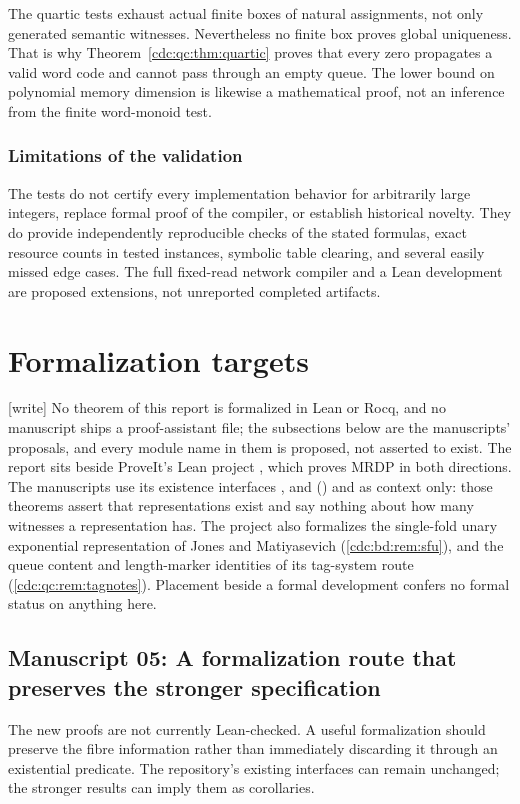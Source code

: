 \documentclass[11pt,a4paper]{article}
\theoremstyle{definition}
\theoremstyle{remark}
\newcommand{\code}[1]{\texttt{\detokenize{#1}}}
\newcommand{\wtag}{\textup{[write]}}%
\begin{document}
The quartic tests exhaust actual finite boxes of natural assignments, not only generated semantic witnesses. Nevertheless no finite box proves global uniqueness. That is why Theorem~\ref{cdc:qc:thm:quartic} proves that every zero propagates a valid word code and cannot pass through an empty queue. The lower bound on polynomial memory dimension is likewise a mathematical proof, not an inference from the finite word-monoid test.

\subsubsection{Limitations of the validation}
The tests do not certify every implementation behavior for arbitrarily large integers, replace formal proof of the compiler, or establish historical novelty. They do provide independently reproducible checks of the stated formulas, exact resource counts in tested instances, symbolic table clearing, and several easily missed edge cases. The full fixed-read network compiler and a Lean development are proposed extensions, not unreported completed artifacts.


\section{Formalization targets}\label{cdc:sec:formal}
\wtag{} No theorem of this report is formalized in Lean or Rocq, and no manuscript ships a proof-assistant file; the subsections below are the manuscripts' proposals, and every module name in them is proposed, not asserted to exist. The report sits beside ProveIt's Lean project , which proves MRDP in both directions. The manuscripts use its existence interfaces ,  and  () and  as context only: those theorems assert that representations exist and say nothing about how many witnesses a representation has. The project also formalizes the single-fold unary exponential representation of Jones and Matiyasevich (\cref{cdc:bd:rem:sfu}), and the queue content and length-marker identities of its tag-system route (\cref{cdc:qc:rem:tagnotes}). Placement beside a formal development confers no formal status on anything here.

\subsection{Manuscript 05: A formalization route that preserves the stronger specification}
\label{cdc:sec:formalization}
The new proofs are not currently Lean-checked. A useful formalization should preserve the fibre information rather than immediately discarding it through an existential predicate. The repository's existing \code{Dioph} interfaces can remain unchanged; the stronger results can imply them as corollaries.
\end{document}
